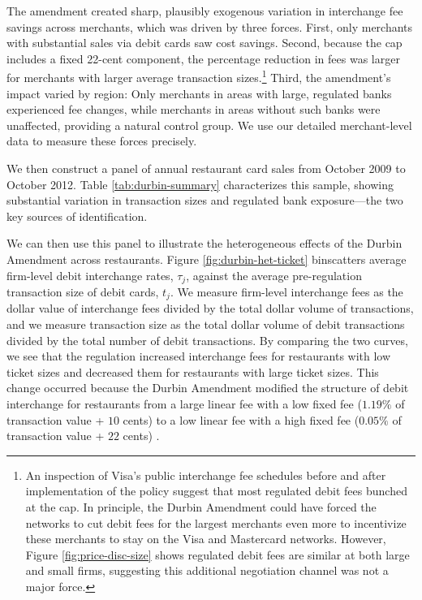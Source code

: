 \documentclass[11pt,english]{article}
\theoremstyle{remark}
\begin{document}
The amendment created sharp, plausibly exogenous variation in interchange fee savings across merchants, which was driven by three forces.
First, only merchants with substantial sales via debit cards saw cost savings.
Second, because the cap includes a fixed 22-cent component, the percentage reduction in fees was larger for merchants with larger average transaction sizes.\footnote{ An inspection of Visa's public interchange fee schedules before and after implementation of the policy suggest that most regulated debit fees bunched at the cap.
In principle, the Durbin Amendment could have forced the networks to cut debit fees for the largest merchants even more to incentivize these merchants to stay on the Visa and Mastercard networks.
However, Figure \ref{fig:price-disc-size} shows regulated debit fees are similar at both large and small firms, suggesting this additional negotiation channel was not a major force. } Third, the amendment's impact varied by region: Only merchants in areas with large, regulated banks experienced fee changes, while merchants in areas without such banks were unaffected, providing a natural control group.
We use our detailed merchant-level data to measure these forces precisely.

We then construct a panel of annual restaurant card sales from October 2009 to October 2012.
Table \ref{tab:durbin-summary} characterizes this sample, showing substantial variation in transaction sizes and regulated bank exposure---the two key sources of identification.

We can then use this panel to illustrate the heterogeneous effects of the Durbin Amendment across restaurants.
Figure \ref{fig:durbin-het-ticket} binscatters average firm-level debit interchange rates, $\tau_j$, against the average pre-regulation transaction size of debit cards, $t_j$.
We measure firm-level interchange fees as the dollar value of interchange fees divided by the total dollar volume of transactions, and we measure transaction size as the total dollar volume of debit transactions divided by the total number of debit transactions.
By comparing the two curves, we see that the regulation increased interchange fees for restaurants with low ticket sizes and decreased them for restaurants with large ticket sizes.
This change occurred because the Durbin Amendment modified the structure of debit interchange for restaurants from a large linear fee with a low fixed fee ($1.19\%$ of transaction value + $10$ cents) to a low linear fee with a high fixed fee ($0.05\%$ of transaction value + $22$ cents) \citep{Visa2010}.
\end{document}
